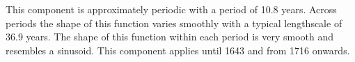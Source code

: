 This component is approximately periodic with a period of 10.8 years.
Across periods the shape of this function varies smoothly with a typical lengthscale of 36.9 years.
The shape of this function within each period is very smooth and resembles a sinusoid.
This component applies until 1643 and from 1716 onwards.